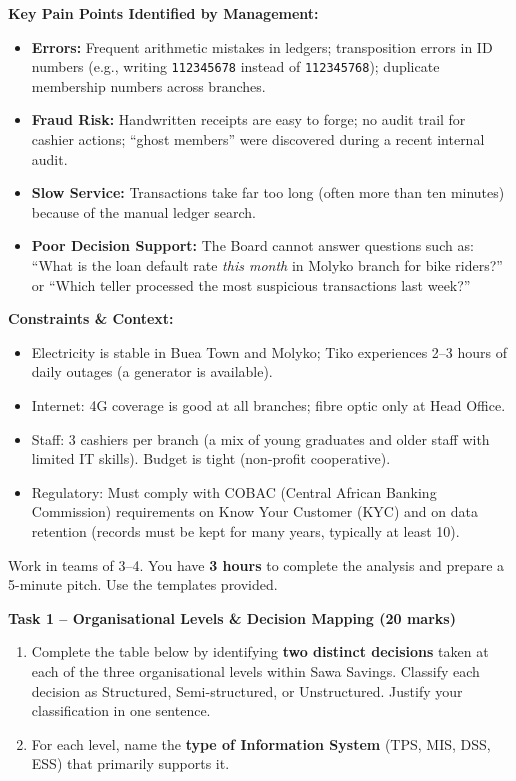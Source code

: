 \documentclass[11pt]{article}
\newcommand{\cle}[1]{{\popxbold\color{popdark}#1}}
\newcounter{popsec}
\newcounter{popsub}
\newcommand{\courssub}[1]{%
  \stepcounter{popsub}%
  \par\vspace{9pt}\noindent{\popxbold\fontsize{11.5}{13}\selectfont\color{popink}{\color{poporange}\thepopsec.\thepopsub}\hspace{6pt}#1}\par\nopagebreak\vspace{4pt}
}
\begin{document}
\medskip
\noindent\textbf{Key Pain Points Identified by Management:}
\begin{itemize}
    \item \textbf{Errors:} Frequent arithmetic mistakes in ledgers; transposition errors in ID numbers (e.g., writing \texttt{112345678} instead of \texttt{112345768}); duplicate membership numbers across branches.
    \item \textbf{Fraud Risk:} Handwritten receipts are easy to forge; no audit trail for cashier actions; ``ghost members'' were discovered during a recent internal audit.
    \item \textbf{Slow Service:} Transactions take far too long (often more than ten minutes) because of the manual ledger search.
    \item \textbf{Poor Decision Support:} The Board cannot answer questions such as: ``What is the loan default rate \emph{this month} in Molyko branch for bike riders?'' or ``Which teller processed the most suspicious transactions last week?''
\end{itemize}

\medskip
\noindent\textbf{Constraints \& Context:}
\begin{itemize}
    \item Electricity is stable in Buea Town and Molyko; Tiko experiences 2--3 hours of daily outages (a generator is available).
    \item Internet: 4G coverage is good at all branches; fibre optic only at Head Office.
    \item Staff: 3 cashiers per branch (a mix of young graduates and older staff with limited IT skills). Budget is tight (non-profit cooperative).
    \item Regulatory: Must comply with COBAC (Central African Banking Commission) requirements on \cle{Know Your Customer (KYC)} and on data retention (records must be kept for many years, typically at least 10).
\end{itemize}

\courssub{Tasks}

Work in teams of 3--4. You have \textbf{3 hours} to complete the analysis and prepare a 5-minute pitch. Use the templates provided.

\medskip
\noindent\textbf{Task 1 -- Organisational Levels \& Decision Mapping (20 marks)}
\begin{enumerate}
    \item Complete the table below by identifying \textbf{two distinct decisions} taken at each of the three organisational levels within Sawa Savings. Classify each decision as \cle{Structured}, \cle{Semi-structured}, or \cle{Unstructured}. Justify your classification in one sentence.
    \item For each level, name the \textbf{type of Information System} (TPS, MIS, DSS, ESS) that primarily supports it.
\end{enumerate}
\end{document}
